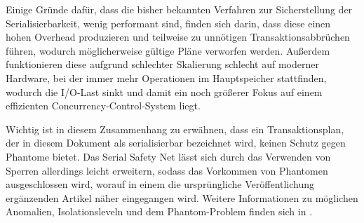 Einige Gründe dafür, dass die bisher bekannten Verfahren zur Sicherstellung der Serialisierbarkeit, wenig performant sind, finden sich darin, dass diese einen hohen Overhead produzieren und teilweise zu unnötigen Transaktionsabbrüchen führen, wodurch möglicherweise gültige Pläne verworfen werden.
Außerdem funktionieren diese aufgrund schlechter Skalierung schlecht auf moderner Hardware, bei der immer mehr Operationen im Hauptspeicher stattfinden, wodurch die I/O-Last sinkt und damit ein noch größerer Fokus auf einem effizienten Concurrency-Control-System liegt.

Wichtig ist in diesem Zusammenhang zu erwähnen, dass ein Transaktionsplan, der in diesem Dokument als serialisierbar bezeichnet wird, keinen Schutz gegen Phantome bietet.
Das Serial Safety Net lässt sich durch das Verwenden von Sperren allerdings leicht erweitern, sodass das Vorkommen von Phantomen ausgeschlossen wird, worauf in einem die ursprüngliche Veröffentlichung ergänzenden Artikel näher eingegangen wird. \cite{WangJFP16}
Weitere Informationen zu möglichen Anomalien, Isolationsleveln und dem Phantom-Problem finden sich in \cite{Berenson:1995}.